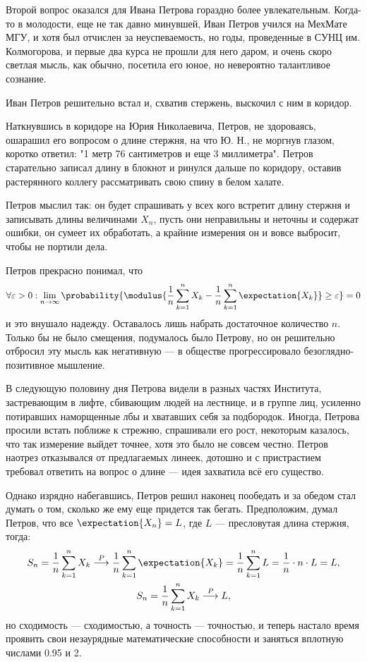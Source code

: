 Второй вопрос оказался для Ивана Петрова гораздно более увлекательным. Когда-то в молодости, еще не так давно минувшей, Иван Петров учился на МехМате МГУ, и хотя был
отчислен за неуспеваемость, но годы, проведенные в СУНЦ им. Колмогорова, и первые два курса не прошли для него даром, и очень скоро светлая мысль, как обычно, посетила
его юное, но невероятно талантливое сознание.

Иван Петров решительно встал и, схватив стержень, выскочил с ним в коридор.

Наткнувшись в коридоре на Юрия Николаевича, Петров, не здороваясь, ошарашил его вопросом о
длине стержня, на что Ю. Н., не моргнув глазом, коротко ответил: "1 метр 76 сантиметров и еще 3 миллиметра". Петров старательно записал длину в блокнот и
ринулся дальше по коридору, оставив растерянного коллегу рассматривать свою спину в белом халате.

Петров мыслил так: он будет спрашивать у всех кого встретит длину стержня и записывать длины величинами $X_n$, пусть они неправильны и неточны и содержат ошибки, он сумеет
их обработать, а крайние измерения он и вовсе выбросит, чтобы не портили дела.

Петров прекрасно понимал, что
\begin{equation}
    \forall \varepsilon > 0: \lim_{n \rightarrow \infty} \probability{ \modulus{ \frac{1}{n} \sum_{k=1}^n X_k - \frac{1}{n} \sum_{k=1}^n \expectation{X_k} } \ge \varepsilon } = 0
\end{equation}
и это внушало надежду. Оставалось лишь набрать достаточное количество $n$. Только бы не было смещения, подумалось было Петрову, но он решительно отбросил эту мысль
как негативную --- в обществе прогрессировало безоглядно-позитивное мышление.

В следующую половину дня Петрова видели в разных частях Института, застревающим в лифте, сбивающим людей на лестнице, и в группе лиц, усиленно потиравших наморщенные лбы
и хватавших себя за подбородок. Иногда, Петрова просили встать поближе к стрежню, спрашивали его рост, некоторым казалось, что так измерение выйдет точнее, хотя это было
не совсем честно. Петров наотрез отказывался от предлагаемых линеек, дотошно и с пристрастием требовал ответить на вопрос о длине --- идея захватила всё его существо.

Однако изрядно набегавшись, Петров решил наконец пообедать и за обедом стал думать о том, сколько же ему еще придется так бегать. Предположим, думал Петров, что все $\expectation{X_n} = L$, где $L$ --- пресловутая длина стержня, тогда:
\begin{gather}
    S_n = \frac{1}{n} \sum_{k=1}^n X_k \stackrel{P}{\longrightarrow} \frac{1}{n} \sum_{k=1}^n \expectation{X_k} = \frac{1}{n} \sum_{k=1}^n L = \frac{1}{n} \cdot n \cdot L = L , \\
    S_n = \frac{1}{n} \sum_{k=1}^n X_k \stackrel{P}{\longrightarrow} L ,
\end{gather}
но сходимость --- сходимостью, а точность --- точностью, и теперь настало время проявить свои незаурядные математические способности и заняться вплотную числами 0.95 и 2.

